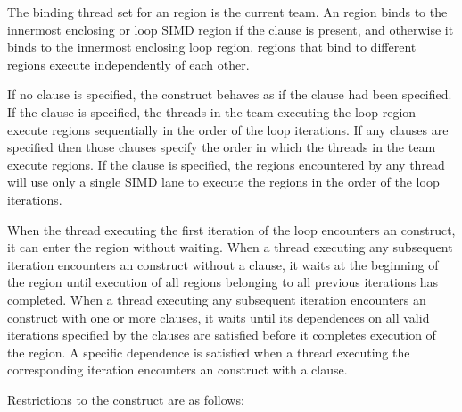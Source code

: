 \binding
The binding thread set for an  region is the current team. An  region 
binds to the innermost enclosing  or loop SIMD region if the
 clause is present, and otherwise it binds to the innermost
enclosing loop region.  regions that bind to different regions
execute independently of each other.

\descr
If no clause is specified, the  construct behaves as if the
 clause had been specified. If the  clause is
specified, the threads in the team executing the loop region execute
 regions sequentially in the order of the loop iterations.
If any  clauses are specified then those clauses specify the 
order in which the threads in the team execute  regions. If
the  clause is specified, the  regions encountered by
any thread will use only a single SIMD lane to execute the 
regions in the order of the loop iterations.

When the thread executing the first iteration of the loop encounters an
 construct, it can enter the  region without
waiting. When a thread executing any subsequent iteration encounters an
 construct without a  clause, it waits at the
beginning of the  region until execution of all 
regions belonging to all previous iterations has completed. When a thread
executing any subsequent iteration encounters an  construct with
one or more  clauses, it waits until its dependences on 
all valid iterations specified by the  clauses
are satisfied before it completes execution of the  region.
A specific dependence is satisfied when a thread executing the corresponding
iteration encounters an  construct with a  clause.



\restrictions
Restrictions to the  construct are as follows:

